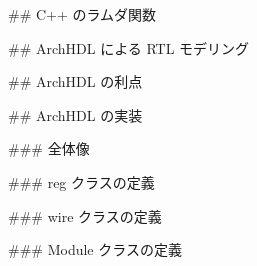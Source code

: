 ## C++ のラムダ関数






## ArchHDL による RTL モデリング







## ArchHDL の利点







## ArchHDL の実装









### 全体像







### reg クラスの定義





### wire クラスの定義





### Module クラスの定義





